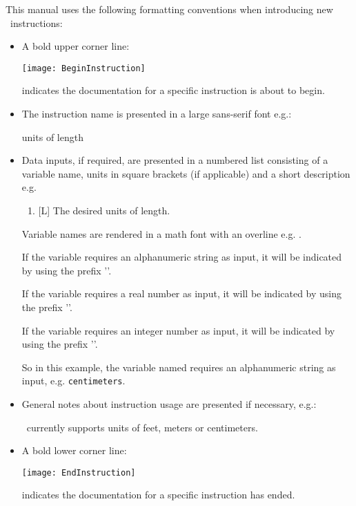 This manual uses the following formatting conventions when introducing new \mut\ instructions:
\begin{itemize}
  \item A bold upper corner line: 

  \texttt{[image: BeginInstruction]}
  
  indicates the documentation for a specific instruction is about to begin.

  \item The instruction name is presented in a large sans-serif font e.g.:
  
  {\Large \sf units of length }
  
  \item Data inputs, if required, are presented  in a numbered list consisting of a variable name, units in square brackets (if applicable) and a short description e.g.\:
    
        \begin{enumerate}
        \item {}[L]  The desired units of length.
        \end{enumerate}

        Variable names are rendered in a math font with an overline e.g. .

         If the variable requires an alphanumeric string as input, it will be indicated by using the prefix '\str{}'.

         If the variable requires a real number as input, it will be indicated by using the prefix  '\rnum{}'.

         If the variable requires an integer number as input, it will be indicated by using the prefix  '\inum{}'.
         
         So in this example, the variable named  requires an alphanumeric string as input, e.g. {\tt centimeters}.



  \item General notes about instruction usage are presented if necessary, e.g.:
      
         \mfus\ currently supports units of feet, meters or centimeters.
      
  \item A bold lower corner line: 

  \texttt{[image: EndInstruction]}
  
   indicates the documentation for a specific instruction has ended.

\end{itemize}

